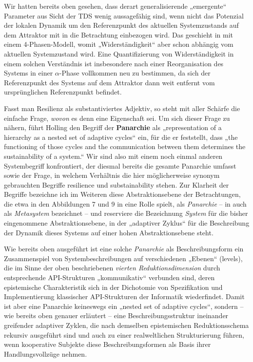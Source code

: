 \documentclass[11pt,a4paper]{article}
\begin{document}
Wir hatten bereits oben gesehen, dass derart generalisierende „emergente“
Parameter aus Sicht der TDS wenig aussagefähig sind, wenn nicht das Potenzial
der lokalen Dynamik um den Referenzpunkt des aktuellen Systemzustands auf dem
Attraktor mit in die Betrachtung einbezogen wird. Das geschieht in
\cite{Holling2000} mit einem 4-Phasen-Modell, womit „Widerständigkeit“ aber
schon abhängig vom aktuellen Systemzustand wird. Eine Quantifizierung von
Widerständig\-keit in einem solchen Verständnis ist insbesondere nach einer
Reorganisation des Systems in einer $\alpha$-Phase vollkommen neu zu
bestimmen, da sich der Referenzpunkt des Systems auf dem Attraktor dann weit
entfernt vom ursprünglichen Referenzpunkt befindet.

Fasst man Resilienz als substantiviertes Adjektiv, so steht mit aller Schärfe
die einfache Frage, \emph{wovon} es denn eine Eigenschaft sei.  Um sich dieser
Frage zu nähern, führt Holling den Begriff der \textbf{Panarchie} als
„representation of a hierarchy as a nested set of adaptive cycles“ ein, für
die er feststellt, dass „the functioning of those cycles and the communication
between them determines the sustainability of a system.“ Wir sind also mit
einem noch einmal anderen Systembegriff konfrontiert, der diesmal bereits die
gesamte Panarchie umfasst sowie der Frage, in welchem Verhältnis die hier
möglicherweise synonym gebrauchten Begriffe resilience und substainability
stehen. Zur Klarheit der Begriffe bezeichne ich im Weiteren diese
Abstraktionsebene der Betrachtungen, die etwa in den Abbildungen 7 und 9 in
\cite{Holling2000} eine Rolle spielt, als \emph{Panarchie} -- in
\cite{Brand2007} auch als \emph{Metasystem} bezeichnet -- und reserviere die
Bezeichnung \emph{System} für die bisher eingenommene Abstraktionsebene, in
der „adaptiver Zyklus“ für die Beschreibung der Dynamik dieses Systems auf
einer hohen Abstraktionsebene steht.

Wie bereits oben ausgeführt ist eine solche \emph{Panarchie} als
Beschreibungsform ein Zusammenspiel von Systembeschreibungen auf verschiedenen
„Ebenen“ (levels), die im Sinne der oben beschriebenen \emph{vierten
  Reduktionsdimension} durch entsprechende API-Strukturen „kommunikativ“
verbunden sind, deren epistemische Charakteristik sich in der Dichotomie von
Spezifikation und Implementierung klassischer API-Strukturen der Informatik
wiederfindet. Damit ist aber eine Panarchie keineswegs ein „nested set of
adaptive cycles“, sondern -- wie bereits oben genauer erläutert -- eine
Beschreibungsstruktur ineinander greifender adaptiver Zyklen, die nach
demselben epistemischen Reduktionsschema rekursiv ausgeführt sind und auch zu
einer realweltlichen Strukturierung führen, wenn kooperative Subjekte diese
Beschreibungsformen als Basis ihrer Handlungsvollzüge nehmen.
\end{document}

